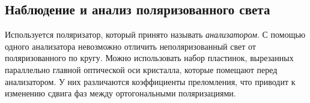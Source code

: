 \subsection*{Наблюдение и анализ поляризованного света}
Используется поляризатор, который принято называть \textit{анализатором}.
\n\n
С помощью одного анализатора невозможно отличить неполяризованный свет от поляризованного по кругу. Можно использовать набор пластинок, вырезанных параллельно главной оптической оси кристалла, которые помещают перед анализатором. У них различаются коэффициенты преломления, что приводит к изменению сдвига фаз между ортогональными поляризациями.
%
